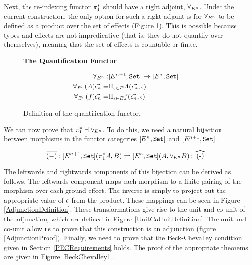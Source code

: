 Next, the re-indexing functor $\pi_1^*$ should have a right adjoint, $\forall_{E^n}$. Under the current construction, the only option for such a right adjoint is for $\forall_{E^n}$ to be defined as a product over the set of effects (Figure \ref{ProductQuantification}). This is possible because types and effects are not impredicative (that is, they do not quantify over themselves), meaning that the set of effects is countable or finite.

\begin{figure}
    \begin{framed}
        \centering
        \textbf{The Quantification Functor}

        \begin{align*}
            \forall_{E^n}:& [E^{n+1}, \texttt{Set}] \rightarrow [E^n, \texttt{Set}]\\
            \forall_{E^n}(A)\vec{\epsilon_n} =&\Pi_{\epsilon\in E}{A(\vec{\epsilon_n}, \epsilon)}
            \\ 
            \forall_{E^n}(f)\vec{\epsilon_n} =&\Pi_{\epsilon\in E}{f(\vec{\epsilon_n}, \epsilon)}
        \end{align*}
        
    \end{framed}
    \caption{Definition of the quantification functor.}
    \label{ProductQuantification}
\end{figure}



We can now prove that $\pi_1^* \dashv \forall_{E^n}$. To do this, we need a natural bijection between morphisms in the functor categories $[E^n, \texttt{Set}]$ and $[E^{n+1}, \texttt{Set}]$.

\begin{equation}
    \bar{(-)}: [E^{n+1}, \set](\pstar A, B) \rightleftharpoons [E^n,\set] (A, \allEn B): \widehat{(-)}
\end{equation}

The leftwards and rightwards components of this bijection can be derived as follows. The leftwards component maps each morphism to a finite pairing of the morphism over each ground effect. The inverse is simply to project out the appropriate value of $\epsilon$ from the product. These mappings can be seen in Figure \ref{AdjunctionDefinition}. These transformations give rise to the unit and co-unit of the adjunction, which are defined in Figure \ref{UnitCoUnitDefinition}. The unit and co-unit allow us to prove that this construction is an adjunction (figure \ref{AdjunctionProof}).  Finally, we need to prove that the Beck-Chevalley condition given in Section \ref{PECRequirements} holds. The proof of the appropriate theorems are given in Figure \ref{BeckChevalley1}.




